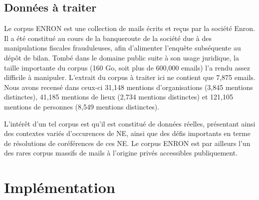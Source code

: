 \documentclass{article}
\begin{document}
\subsection{Données à traiter}
\par
Le corpus ENRON est une collection de mails écrits et reçus par la société Enron.
Il a été constitué au cours de la banqueroute de la société due à des manipulations fiscales frauduleuses, afin d'alimenter l'enquête subséquente au dépôt de bilan.
Tombé dans le domaine public suite à son usage juridique, la taille importante du corpus (160 Go, soit plus de 600,000 emails) l'a rendu assez difficile à manipuler.
L'extrait du corpus à traiter ici ne contient que 7,875 emails.
Nous avons recensé dans ceux-ci 31,148 mentions d'organisations (3,845 mentions distinctes), 41,185 mentions de lieux (2,734 mentions distinctes) et 121,105 mentions de personnes (8,549 mentions distinctes).
\par
L'intérêt d'un tel corpus est qu'il est constitué de données réelles, présentant ainsi des contextes variés d'occurences de NE, ainsi que des défis importants en terme de résolutions de coréférences de ces NE.
Le corpus ENRON est par ailleurs l'un des rares corpus massifs de mails à l'origine privés accessibles publiquement.

\section{Implémentation}
\end{document}
